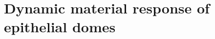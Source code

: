 \documentclass[11pt, final, a4paper, twoside, openright]{book}
\begin{document}
	\renewcommand{\thesection}{7.\arabic{section}}
	\hypertarget{dynamic-material-response-of-epithelial-domes}{%
	\chapter{Dynamic material response of epithelial
	domes}\label{dynamic-material-response-of-epithelial-domes}}
	
%
%	
%	
%	
%	
%
%
%		
	
	\backmatter
	
	
\end{document}
